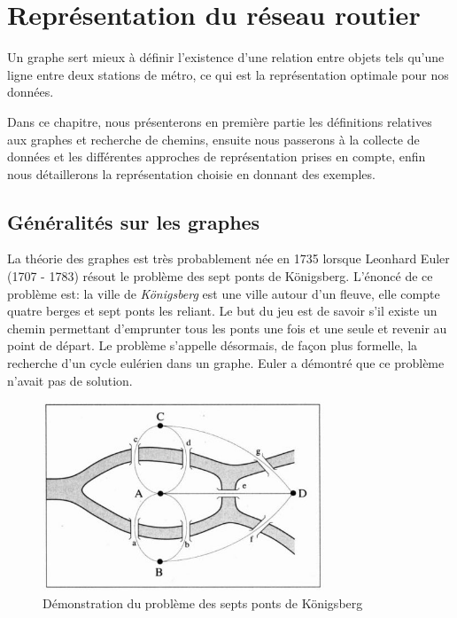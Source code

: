 \chapter{Représentation du réseau routier}
Un graphe sert mieux à définir l'existence d'une relation entre objets tels qu'une ligne entre deux stations de métro, ce qui est la représentation optimale pour nos données. 

Dans ce chapitre, nous présenterons en première partie les définitions relatives aux graphes et recherche de chemins, ensuite nous passerons à la collecte de données et les différentes approches de représentation prises en compte, enfin nous détaillerons la représentation choisie en donnant des exemples.

\section{Généralités sur les graphes}
La théorie des graphes est très probablement née en 1735 lorsque Leonhard Euler (1707 - 1783) résout le problème des sept ponts de Königsberg. 
L'énoncé de ce problème est: la ville de \emph{Königsberg} est une ville autour d'un fleuve, elle compte quatre berges et sept ponts les reliant. Le but du jeu est de savoir s'il existe un chemin permettant d'emprunter tous les ponts une fois et une seule et revenir au point de départ. Le problème s'appelle désormais, de façon plus formelle, la recherche d'un cycle eulérien dans un graphe. Euler a démontré que ce problème n'avait pas de solution.

\begin{figure}[h!]
\center
\includegraphics[width=0.75\textwidth]{img/Bridges.jpg}
\caption{Démonstration du problème des septs ponts de Königsberg}
\end{figure}

